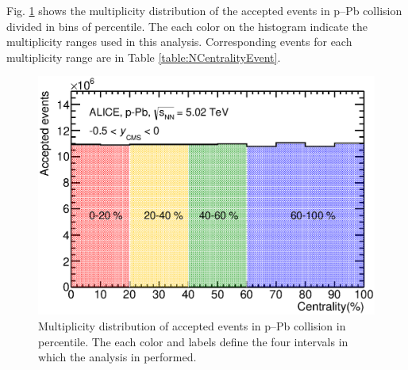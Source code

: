 



 Fig. \ref{fig:pPb:Centrality} shows the multiplicity distribution of the accepted events in p--Pb collision divided in bins of percentile. The each color on the histogram indicate the multiplicity ranges used in this analysis. Corresponding events for each multiplicity range are in Table \ref{table:NCentralityEvent}. 
 

\begin{figure}[htbp]
\begin{center}
\includegraphics[width=10.cm]{./Version1/FigChapter5/Selection/pPbCentrality.eps}
\caption{ Multiplicity distribution of accepted events in p--Pb collision in percentile. The each color and labels define the four intervals in which the analysis in performed.}
\label{fig:pPb:Centrality}
\end{center}
\end{figure}

